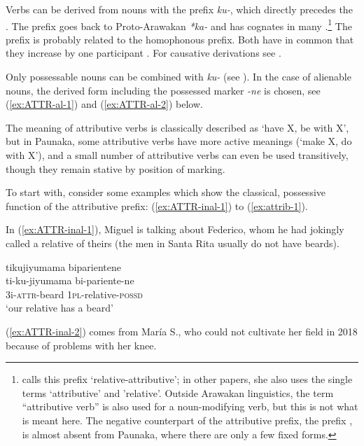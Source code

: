 Verbs can be derived from nouns with the prefix \textit{ku-}, which directly precedes the . The prefix goes back to Proto-Ara\-wa\-kan \textit{*ka-} \citep[377]{Payne1991} and has cognates in many  \citep[cf.][95]{Aikhenvald1999}.\footnote{\citet[95]{Aikhenvald1999} calls this prefix ‘relative-attributive’; in other papers, she also uses the single terms ‘attributive’  and 'relative’. %
Outside Arawakan linguistics, the term “attributive verb” is also used for a noun-modifying verb, but this is not what is meant here. The negative counterpart of the attributive prefix, the  prefix \citep[cf.][285]{Michael2014b}, is almost absent from Paunaka, where there are only a few fixed forms.} The prefix is probably related to the homophonous  prefix. Both have in common that they increase  by one participant \citep[+VAL1, cf.][289]{Danielsen2014a}. For causative derivations see .

Only possessable nouns can be combined with \textit{ku-} (see ). In the case of alienable nouns, the derived form including the possessed marker \textit{-ne} is chosen, see (\ref{ex:ATTR-al-1}) and (\ref{ex:ATTR-al-2}) below.

The meaning of attributive verbs is classically described as ‘have X, be with X’, but in Paunaka, some attributive verbs have more active meanings (‘make X, do with X’), and a small number of attributive verbs can even be used transitively, though they remain stative by position of  marking.

To start with, consider some examples which show the classical, possessive function of the attributive prefix: (\ref{ex:ATTR-inal-1}) to (\ref{ex:attrib-1}).

In (\ref{ex:ATTR-inal-1}), Miguel is talking about Federico, whom he had jokingly called a relative of theirs (the men in Santa Rita usually do not have beards).

\ea\label{ex:ATTR-inal-1}
\begingl
\glpreamble tikujiyumama biparientene\\
\gla ti-ku-jiyumama bi-pariente-ne\\
\glb 3i-\textsc{attr}-beard 1\textsc{pl}-relative-\textsc{possd}\\
\glft ‘our relative has a beard’
\endgl
\trailingcitation{[ump-p110815sf.669]}
\xe

(\ref{ex:ATTR-inal-2}) comes from María S., who could not cultivate her field in 2018 because of problems with her knee.

